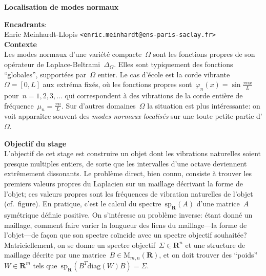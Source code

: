 \documentclass[a4paper,11pt]{article}
\begin{document}
\thispagestyle{empty}

{\bf
	Localisation de modes normaux
}

{\bf Encadrants}:\\
Enric Meinhardt-Llopis \verb+<enric.meinhardt@ens-paris-saclay.fr>+ \\

{\bf Contexte}\\
Les modes normaux d'une variété compacte~$\Omega$ sont les fonctions propres de
son opérateur de Laplace-Beltrami~$\Delta_\Omega$.  Elles sont typiquement des
fonctions ``globales'', supportées par~$\Omega$ entier.  Le cas d'école est la
corde vibrante~$\Omega=[0,L]$ aux extréma fixés, où les
fonctions propres sont~$\varphi_n(x)=\sin\frac{\pi n x}L$
pour~$n=1,2,3,\ldots$ qui correspondent à des vibrations de
la corde entière de fréquence~$\mu_n=\frac{\pi n}L$.  Sur d'autres
domaines~$\Omega$ la situation est plus intéressante: on voit apparaître
souvent des \emph{modes normaux localisés} sur une toute petite partie
d'$\Omega$.


{\bf Objectif du stage}\\
L'objectif de cet stage est construire un objet dont les vibrations naturelles
soient presque multiples entiers, de sorte que les intervalles d'une octave
deviennent extrêmement dissonants.  Le problème direct, bien connu, consiste à
trouver les premiers valeurs propres du Laplacien sur un maillage décrivant la
forme de l'objet; ces valeurs propres sont les fréquences de vibration
naturelles de l'objet (cf.~figure).  En pratique, c'est le calcul du
spectre~$\mathrm{sp}_{\mathbf{R}}(A)$ d'une matrice~$A$
symétrique définie positive.  On s'intéresse au problème inverse: étant donné un
maillage, comment faire varier la longueur des liens du maillage---la forme de
l'objet---de façon que son spectre coïncide avec un spectre
objectif souhaitée?  Matriciellement, on se donne un spectre
objectif~$\Sigma\in\mathbf{R}^n$ et une structure de maillage décrite par une
matrice~$B\in\mathrm{M}_{m,n}(\mathbf{R})$, et on doit trouver des
``poids''~$W\in\mathbf{R}^m$ tels
que~$\mathrm{sp}_\mathbf{R}\left(B^T\mathrm{diag}(W)B\right)=\Sigma$.
\end{document}
